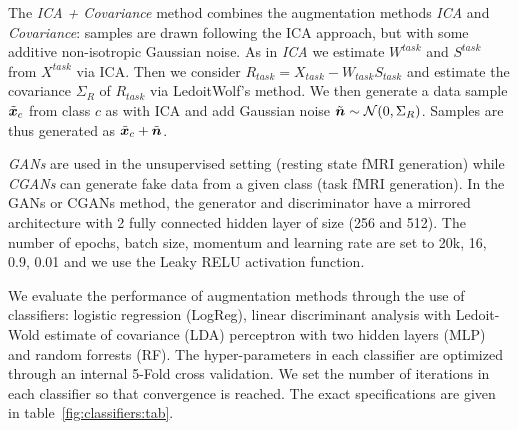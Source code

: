 The \emph{ICA + Covariance} method combines the augmentation
methods \emph{ICA} and \emph{Covariance}: samples are drawn following
the ICA approach, but with some additive non-isotropic Gaussian noise.
%
As in \emph{ICA} we estimate $W^{task}$ and $S^{task}$ from
$X^{task}$ via ICA.
%
Then we consider $R_{task} = X_{task} - W_{task} S_{task}$ and estimate the
covariance $\Sigma_R$ of $R_{task}$ via LedoitWolf's method.
%
We then generate a data sample $\tilde{\boldsymbol{x}}_c$ from class $c$ as with ICA and add
Gaussian noise $\tilde{\boldsymbol{n}} \sim \mathcal{N}(0,\Sigma_R)$.
%
Samples are thus generated as $\tilde{\boldsymbol{x}}_c + \tilde{\boldsymbol{n}}$.

\emph{GANs} are used in the unsupervised setting (resting state fMRI generation)
while \emph{CGANs} can generate fake data from a given class (task fMRI
generation). In the GANs or CGANs method, the generator and discriminator have a mirrored architecture with 2 fully connected hidden layer of size (256 and 512).  The number of epochs, batch size, momentum and learning rate are set to 20k, 16, 0.9, 0.01 and we use the Leaky RELU activation function.

We evaluate the performance of augmentation methods through the use of classifiers: logistic regression (LogReg), linear
discriminant analysis with Ledoit-Wold estimate of covariance (LDA) perceptron
with two hidden layers (MLP) and random forrests (RF).
The hyper-parameters in each classifier are optimized through an internal 5-Fold
cross validation. We set the number of iterations in each classifier so that
convergence is reached. The exact specifications are given in table~\ref{fig:classifiers:tab}.

